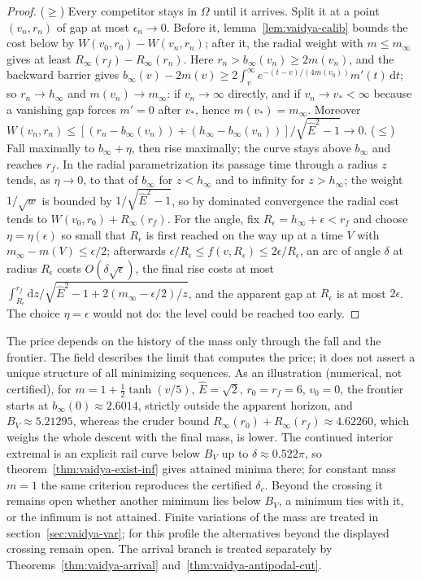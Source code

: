 \documentclass[aip,jmp,amsmath,amssymb,reprint]{revtex4-2}
\newcommand{\Ehat}{\hat E}
\newcommand{\dd}{\mathrm{d}}
\theoremstyle{plain}
\theoremstyle{definition}
\begin{document}
\begin{proof}
($\ge$) Every competitor stays in $\Omega$ until it arrives. Split it at a point $(v_n,r_n)$ of
gap at most $\epsilon_n\to0$. Before it, lemma~\ref{lem:vaidya-calib} bounds the cost below by
$W(v_0,r_0)-W(v_n,r_n)$; after it, the radial weight with $m\le m_\infty$ gives at least
$R_\infty(r_f)-R_\infty(r_n)$. Here $r_n>b_\infty(v_n)\ge2m(v_n)$, and the backward barrier gives
$b_\infty(v)-2m(v)\ge2\int_v^\infty e^{-(t-v)/(4m(v_0))}m'(t)\,\dd t$; so $r_n\to h_\infty$ and
$m(v_n)\to m_\infty$: if $v_n\to\infty$ directly, and if $v_n\to v_*<\infty$ because a vanishing gap
forces $m'=0$ after $v_*$, hence $m(v_*)=m_\infty$. Moreover
$W(v_n,r_n)\le[(r_n-b_\infty(v_n))+(h_\infty-b_\infty(v_n))]/\sqrt{\Ehat^2-1}\to0$.
($\le$) Fall maximally to $b_\infty+\eta$, then rise maximally; the curve stays above $b_\infty$ and
reaches $r_f$. In the radial parametrization its passage time through a radius $z$ tends,
as $\eta\to0$, to that of $b_\infty$ for $z<h_\infty$ and to infinity for $z>h_\infty$; the weight $1/\sqrt w$
is bounded by $1/\sqrt{\Ehat^2-1}$, so by dominated convergence the radial cost tends to
$W(v_0,r_0)+R_\infty(r_f)$. For the angle, fix $R_\epsilon=h_\infty+\epsilon<r_f$ and choose $\eta=\eta(\epsilon)$ so
small that $R_\epsilon$ is first reached on the way up at a time $V$ with $m_\infty-m(V)\le\epsilon/2$; afterwards
$\epsilon/R_\epsilon\le f(v,R_\epsilon)\le2\epsilon/R_\epsilon$, an arc of angle $\delta$ at radius $R_\epsilon$ costs
$O(\delta\sqrt\epsilon)$, the final rise costs at most
$\int_{R_\epsilon}^{r_f}\dd z/\sqrt{\Ehat^2-1+2(m_\infty-\epsilon/2)/z}$, and the apparent gap at $R_\epsilon$ is at
most $2\epsilon$. The choice $\eta=\epsilon$ would not do: the level could be reached too early.
\end{proof}

The price depends on the history of the mass only through the fall and the frontier. The
field describes the limit that computes the price; it does not assert a unique structure of
all minimizing sequences. As an illustration (numerical, not certified), for
$m=1+\frac12\tanh(v/5)$, $\Ehat=\sqrt2$, $r_0=r_f=6$, $v_0=0$, the frontier starts at $b_\infty(0)\approx2.6014$,
strictly outside the apparent horizon, and $B_V\approx5.21295$, whereas the cruder bound
$R_\infty(r_0)+R_\infty(r_f)\approx4.62260$, which weighs the whole descent with the final mass, is
lower. The continued interior extremal is an explicit rail curve below $B_V$ up to
$\delta\approx0.522\pi$, so theorem~\ref{thm:vaidya-exist-inf} gives attained minima there; for constant
mass $m=1$ the same criterion reproduces the certified $\delta_c$. Beyond the crossing it remains open
whether another minimum lies below $B_V$, a minimum ties with it, or the infimum is not
attained. Finite variations of the mass are treated in section~\ref{sec:vaidya-var}; for this profile the
alternatives beyond the displayed crossing remain open. The arrival branch is treated
separately by Theorems~\ref{thm:vaidya-arrival} and~\ref{thm:vaidya-antipodal-cut}.
\end{document}
